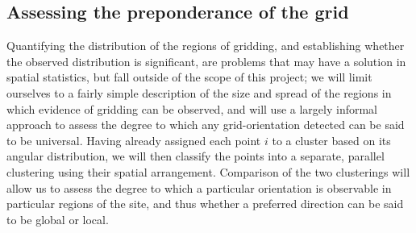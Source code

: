 \documentclass[../../ArchStats.tex]{subfiles}
\begin{document}

\subsection{Assessing the preponderance of the grid}

Quantifying the distribution of the regions of gridding, and establishing whether the observed distribution is significant, are problems that may have a solution in spatial statistics, but fall outside of the scope of this project; we will limit ourselves to a fairly simple description of the size and spread of the regions in which evidence of gridding can be observed, and will use a largely informal  approach to assess the degree to which any grid-orientation detected can be said to be universal. 
Having already assigned each point $i$ to a cluster based on its angular distribution, we will then classify the points into a separate, parallel clustering using their spatial arrangement. Comparison of the two clusterings will allow us to assess the degree to which a particular orientation is observable in particular regions of the site, and thus whether a preferred direction can be said to be global or local.
\end{document}

